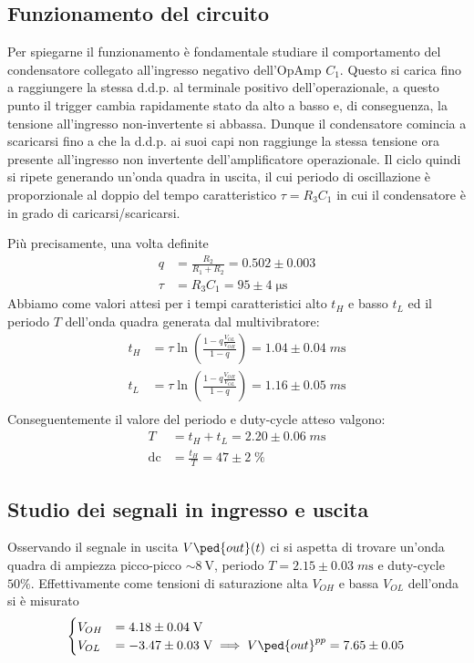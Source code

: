 \documentclass[10pt, a4paper, italian]{article}
\begin{document}
\subsection{Funzionamento del circuito}
Per spiegarne il funzionamento è fondamentale studiare il comportamento del
condensatore collegato all'ingresso negativo dell'OpAmp $C_1$. Questo si
carica fino a raggiungere la stessa d.d.p. al terminale positivo
dell'operazionale, a questo punto il trigger cambia rapidamente stato da alto
a basso e, di conseguenza, la tensione all'ingresso non-invertente si abbassa.
Dunque il condensatore comincia a scaricarsi fino a che la d.d.p. ai suoi capi
non raggiunge la stessa tensione ora presente all'ingresso non invertente
dell'amplificatore operazionale.
Il ciclo quindi si ripete generando un'onda quadra in uscita, il cui
periodo di oscillazione è proporzionale al doppio del tempo caratteristico
$\tau = R_3 C_1$ in cui il condensatore è in grado di caricarsi/scaricarsi.

Più precisamente, una volta definite
\begin{align*}
q &= \frac{R_2}{R_1 + R_2} = 0.502 \pm 0.003 \\
\tau &= R_3 C_1 = 95 \pm 4 \; \si{\micro\s}
\end{align*}
Abbiamo come valori attesi per i tempi caratteristici alto $t_H$ e basso
$t_L$ ed il periodo $T$ dell'onda quadra generata dal multivibratore:
\begin{align}
t_H &= \tau \ln\left(\frac{1 - q\frac{V_{OL}}{V_{OH}}}{1-q}\right) =
1.04 \pm 0.04 \; \si{m\s} \\
t_L &= \tau \ln\left(\frac{1 - q\frac{V_{OH}}{V_{OL}}}{1-q}\right) =
1.16 \pm 0.05 \; \si{m\s} \\
\end{align}
Conseguentemente il valore del periodo e duty-cycle atteso valgono:
\begin{align}
T &= t_H + t_L = 2.20 \pm 0.06 \; \si{m\s} \\
\mathrm{dc} &= \frac{t_H}{T} = 47 \pm 2 \; \%
\end{align}

\setcounter{subsection}{2}
\subsection{Studio dei segnali in ingresso e uscita}
Osservando il segnale in uscita $V\ped{out} (t)$ ci si aspetta di trovare
un'onda quadra di ampiezza picco-picco $\sim \SI{8}{\V}$, periodo
$T = 2.15 \pm 0.03 \; \si{m\s}$ e duty-cycle $50 \%$. Effettivamente come
tensioni di saturazione alta $V_{OH}$ e bassa $V_{OL}$ dell'onda si è misurato
\begin{align*}
\begin{cases}
V_{OH} &= 4.18 \pm 0.04 \; \si{\V} \\
V_{OL} &= -3.47 \pm 0.03 \; \si{\V}  \implies V\ped{out}^{pp} = 7.65 \pm 0.05
\end{cases}
\end{align*}
\end{document}
